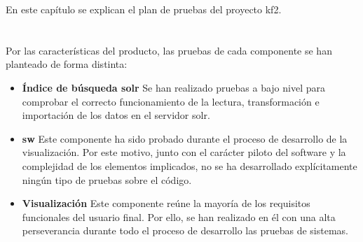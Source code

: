 


En este capítulo se explican el plan de pruebas del proyecto \gls{kf2}.

\section{}


Por las características del producto, las pruebas de cada componente se han planteado de forma distinta:

\begin{itemize}
    \item{\textbf{Índice de búsqueda \gls{solr}}}
    Se han realizado pruebas a bajo nivel para comprobar el correcto funcionamiento de la lectura, transformación e importación de los datos en el servidor \gls{solr}.
    \item{\textbf{\Gls{sw}}}
    Este componente ha sido probado durante el proceso de desarrollo de la visualización. Por este motivo, junto con el carácter piloto del \gls{software} y la complejidad de los elementos implicados, no se ha desarrollado explícitamente ningún tipo de pruebas sobre el código.
    \item{\textbf{Visualización}}
    Este componente reúne la mayoría de los requisitos funcionales del usuario final. Por ello, se han realizado en él con una alta perseverancia durante todo el proceso de desarrollo las pruebas de sistemas.
\end{itemize}

